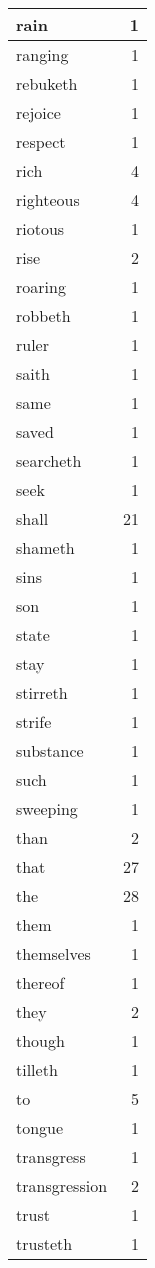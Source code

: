 \begin{center}
\begin{longtable}{l|r}
rain & 1\\ \hline 
ranging & 1\\ \hline 
rebuketh & 1\\ \hline 
rejoice & 1\\ \hline 
respect & 1\\ \hline 
rich & 4\\ \hline 
righteous & 4\\ \hline 
riotous & 1\\ \hline 
rise & 2\\ \hline 
roaring & 1\\ \hline 
robbeth & 1\\ \hline 
ruler & 1\\ \hline 
saith & 1\\ \hline 
same & 1\\ \hline 
saved & 1\\ \hline 
searcheth & 1\\ \hline 
seek & 1\\ \hline 
shall & 21\\ \hline 
shameth & 1\\ \hline 
sins & 1\\ \hline 
son & 1\\ \hline 
state & 1\\ \hline 
stay & 1\\ \hline 
stirreth & 1\\ \hline 
strife & 1\\ \hline 
substance & 1\\ \hline 
such & 1\\ \hline 
sweeping & 1\\ \hline 
than & 2\\ \hline 
that & 27\\ \hline 
the & 28\\ \hline 
them & 1\\ \hline 
themselves & 1\\ \hline 
thereof & 1\\ \hline 
they & 2\\ \hline 
though & 1\\ \hline 
tilleth & 1\\ \hline 
to & 5\\ \hline 
tongue & 1\\ \hline 
transgress & 1\\ \hline 
transgression & 2\\ \hline 
trust & 1\\ \hline 
trusteth & 1\\ \hline 

\end{longtable}
\end{center}
